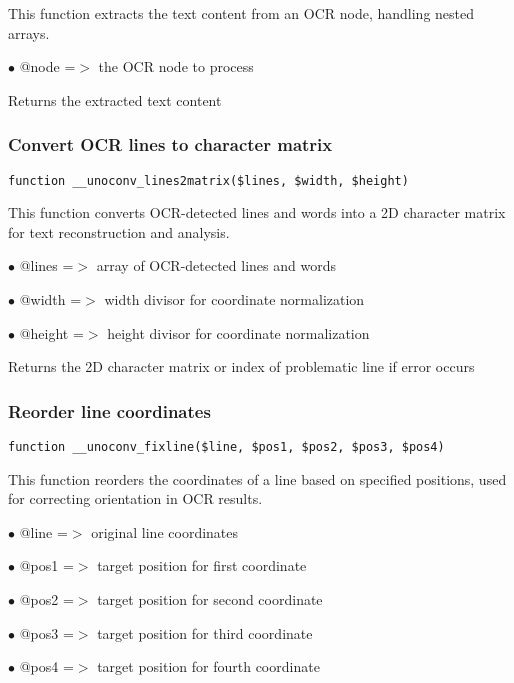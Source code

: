 \documentclass[a4paper]{article}
\begin{document}
This function extracts the text content from an OCR node, handling nested arrays.

\begin{compactitem}
\item[\color{myblue}$\bullet$] @node =$>$ the OCR node to process
\end{compactitem}

Returns the extracted text content

\hypertarget{toc544}{}
\subsubsection{Convert OCR lines to character matrix}

\begin{lstlisting}
function __unoconv_lines2matrix($lines, $width, $height)
\end{lstlisting}

This function converts OCR-detected lines and words into a 2D character matrix
for text reconstruction and analysis.

\begin{compactitem}
\item[\color{myblue}$\bullet$] @lines  =$>$ array of OCR-detected lines and words
\item[\color{myblue}$\bullet$] @width  =$>$ width divisor for coordinate normalization
\item[\color{myblue}$\bullet$] @height =$>$ height divisor for coordinate normalization
\end{compactitem}

Returns the 2D character matrix or index of problematic line if error occurs

\hypertarget{toc545}{}
\subsubsection{Reorder line coordinates}

\begin{lstlisting}
function __unoconv_fixline($line, $pos1, $pos2, $pos3, $pos4)
\end{lstlisting}

This function reorders the coordinates of a line based on specified positions,
used for correcting orientation in OCR results.

\begin{compactitem}
\item[\color{myblue}$\bullet$] @line =$>$ original line coordinates
\item[\color{myblue}$\bullet$] @pos1 =$>$ target position for first coordinate
\item[\color{myblue}$\bullet$] @pos2 =$>$ target position for second coordinate
\item[\color{myblue}$\bullet$] @pos3 =$>$ target position for third coordinate
\item[\color{myblue}$\bullet$] @pos4 =$>$ target position for fourth coordinate
\end{compactitem}
\end{document}
